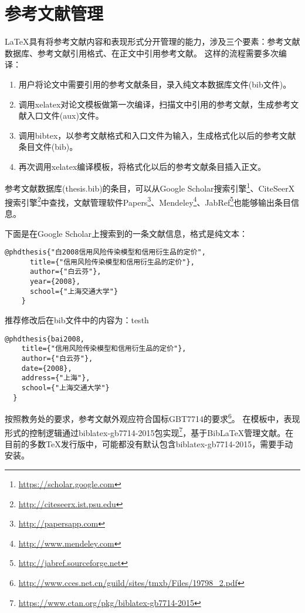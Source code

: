 \section{参考文献管理}

 \LaTeX 具有将参考文献内容和表现形式分开管理的能力，涉及三个要素：参考文献数据库、参考文献引用格式、在正文中引用参考文献。
这样的流程需要多次编译：

\begin{enumerate}[noitemsep,topsep=0pt,parsep=0pt,partopsep=0pt]
	\item 用户将论文中需要引用的参考文献条目，录入纯文本数据库文件(bib文件)。
	\item 调用xelatex对论文模板做第一次编译，扫描文中引用的参考文献，生成参考文献入口文件(aux)文件。
	\item 调用bibtex，以参考文献格式和入口文件为输入，生成格式化以后的参考文献条目文件(bib)。
	\item 再次调用xelatex编译模板，将格式化以后的参考文献条目插入正文。
\end{enumerate}

参考文献数据库(thesis.bib)的条目，可以从Google Scholar搜索引擎\footnote{\url{https://scholar.google.com}}、CiteSeerX搜索引擎\footnote{\url{http://citeseerx.ist.psu.edu}}中查找，文献管理软件Papers\footnote{\url{http://papersapp.com}}、Mendeley\footnote{\url{http://www.mendeley.com}}、JabRef\footnote{\url{http://jabref.sourceforge.net}}也能够输出条目信息。

下面是在Google Scholar上搜索到的一条文献信息，格式是纯文本：

\begin{lstlisting}[caption={从Google Scholar找到的参考文献条目}, label=googlescholar, escapeinside="", numbers=none]
    @phdthesis{"白2008信用风险传染模型和信用衍生品的定价",
      title={"信用风险传染模型和信用衍生品的定价"},
      author={"白云芬"},
      year={2008},
      school={"上海交通大学"}
    } 
\end{lstlisting}

推荐修改后在bib文件中的内容为：testh

\begin{lstlisting}[caption={修改后的参考文献条目}, label=itemok, escapeinside="", numbers=none]
  @phdthesis{bai2008,
    title={"信用风险传染模型和信用衍生品的定价"},
    author={"白云芬"},
    date={2008},
    address={"上海"},
    school={"上海交通大学"}
  } 
\end{lstlisting}

按照教务处的要求，参考文献外观应符合国标GBT7714的要求\footnote{\url{http://www.cces.net.cn/guild/sites/tmxb/Files/19798_2.pdf}}。
在模板中，表现形式的控制逻辑通过biblatex-gb7714-2015包实现\footnote{\url{https://www.ctan.org/pkg/biblatex-gb7714-2015}}，基于{Bib\LaTeX}管理文献。在目前的多数TeX发行版中，可能都没有默认包含biblatex-gb7714-2015，需要手动安装。

